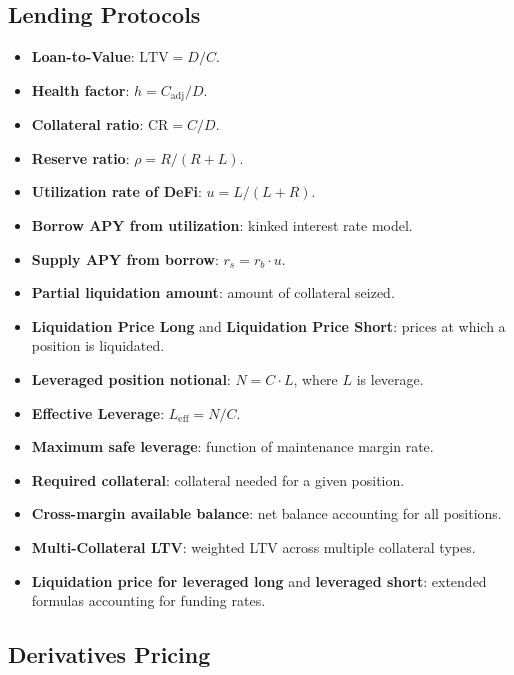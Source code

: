 \documentclass[twoside,11pt]{article}
\begin{document}
\subsection{Lending Protocols}\label{subsec:lending-protocols}
\label{sec:bench_lending}

\begin{itemize}
  \item \textbf{Loan-to-Value}: $\mathrm{LTV} = D/C$.
  \item \textbf{Health factor}: $h = C_{\mathrm{adj}} / D$.
  \item \textbf{Collateral ratio}: $\mathrm{CR} = C/D$.
  \item \textbf{Reserve ratio}: $\rho = R / (R + L)$.
  \item \textbf{Utilization rate of DeFi}: $u = L / (L + R)$.
  \item \textbf{Borrow APY from utilization}: kinked interest rate model.
  \item \textbf{Supply APY from borrow}: $r_s = r_b \cdot u$.
  \item \textbf{Partial liquidation amount}: amount of collateral seized.
  \item \textbf{Liquidation Price Long} and \textbf{Liquidation Price Short}:
    prices at which a position is liquidated.
  \item \textbf{Leveraged position notional}: $N = C \cdot L$, where $L$ is leverage.
  \item \textbf{Effective Leverage}: $L_{\mathrm{eff}} = N/C$.
  \item \textbf{Maximum safe leverage}: function of maintenance margin rate.
  \item \textbf{Required collateral}: collateral needed for a given position.
  \item \textbf{Cross-margin available balance}: net balance accounting for all positions.
  \item \textbf{Multi-Collateral LTV}: weighted LTV across multiple collateral types.
  \item \textbf{Liquidation price for leveraged long} and \textbf{leveraged short}:
    extended formulas accounting for funding rates.
\end{itemize}

\subsection{Derivatives Pricing}\label{subsec:derivatives-pricing}
\label{sec:bench_derivatives}
\end{document}
